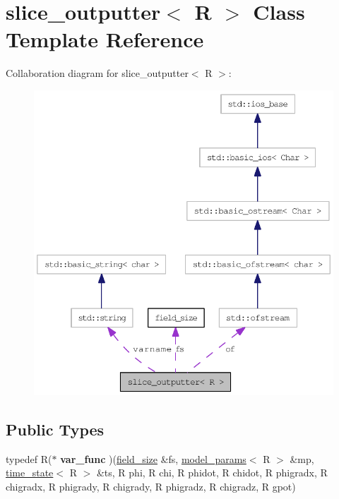 \hypertarget{classslice__outputter}{
\section{slice\_\-outputter$<$ R $>$ Class Template Reference}
\label{classslice__outputter}
}
Collaboration diagram for slice\_\-outputter$<$ R $>$:\nopagebreak
\begin{figure}[H]
\begin{center}
\leavevmode
\includegraphics[width=372pt]{classslice__outputter__coll__graph}
\end{center}
\end{figure}
\subsection*{Public Types}
\begin{DoxyCompactItemize}
\item 
\hypertarget{classslice__outputter_a0917a3b6bc70da35b0b2344342d9ab87}{
typedef R($\ast$ {\bfseries var\_\-func} )(\hyperlink{structfield__size}{field\_\-size} \&fs, \hyperlink{structmodel__params}{model\_\-params}$<$ R $>$ \&mp, \hyperlink{structtime__state}{time\_\-state}$<$ R $>$ \&ts, R phi, R chi, R phidot, R chidot, R phigradx, R chigradx, R phigrady, R chigrady, R phigradz, R chigradz, R gpot)}
\label{classslice__outputter_a0917a3b6bc70da35b0b2344342d9ab87}

\end{DoxyCompactItemize}
